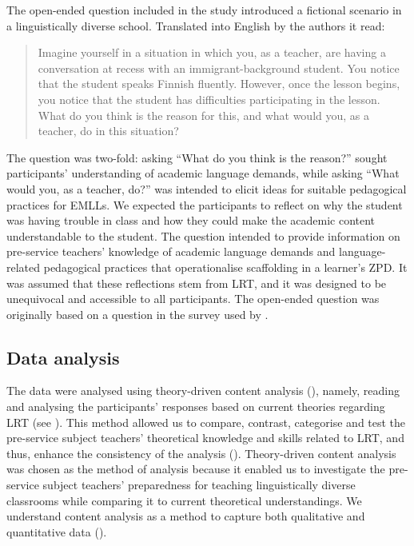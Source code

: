 \documentclass[output=paper]{langscibook}
\begin{document}
The open-ended question included in the study introduced a fictional scenario in a linguistically diverse school. Translated into English by the authors it read:

\begin{quote}
Imagine yourself in a situation in which you, as a teacher, are having a conversation at recess with an immigrant-background student. You notice that the student speaks Finnish fluently. However, once the lesson begins, you notice that the student has difficulties participating in the lesson. What do you think is the reason for this, and what would you, as a teacher, do in this situation?
\end{quote}

The question was two-fold: asking “What do you think is the reason?” sought participants’ understanding of academic language demands, while asking “What would you, as a teacher, do?” was intended to elicit ideas for suitable pedagogical practices for EMLLs. We expected the participants to reflect on why the student was having trouble in class and how they could make the academic content understandable to the student. The question intended to provide information on pre-service teachers’ knowledge of academic language demands and language-related pedagogical practices that operationalise scaffolding in a learner’s ZPD. It was assumed that these reflections stem from LRT, and it was designed to be unequivocal and accessible to all participants. The open-ended question was originally based on a question in the survey used by \citet{Alisaari2020_Apples}. 

\subsection{Data analysis}\label{sec:heikkola:4.2}

The data were analysed using theory-driven content analysis (\citealt{Krippendorf2012, Tuomi2018-1}), namely, reading and analysing the participants’ responses based on current theories regarding LRT (see ). This method allowed us to compare, contrast, categorise and test the pre-service subject teachers’ theoretical knowledge and skills related to LRT, and thus, enhance the consistency of the analysis (\citealt{Tuomi2018-1}). Theory-driven content analysis was chosen as the method of analysis because it enabled us to investigate the pre-service subject teachers’ preparedness for teaching linguistically diverse classrooms while comparing it to current theoretical understandings. We understand content analysis as a method to capture both qualitative and quantitative data (\citealt{Krippendorf2012,Tuomi2018-1}).
\end{document}
